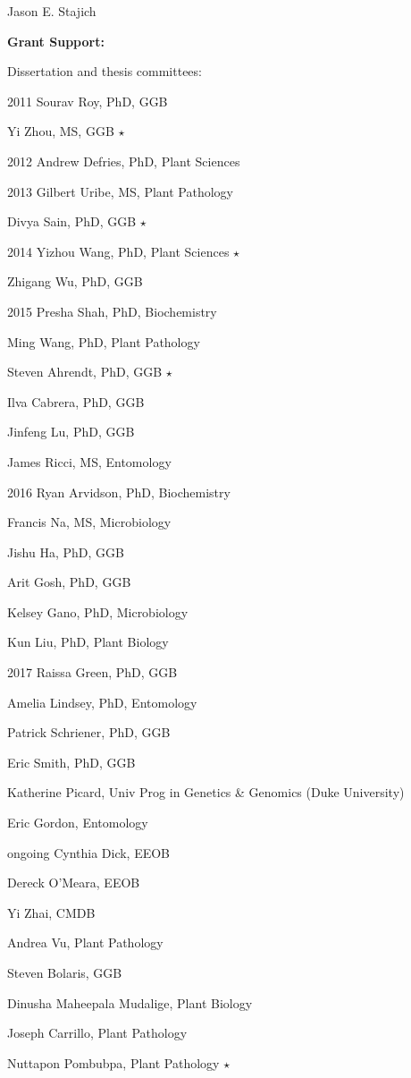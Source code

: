\documentclass[10pt]{article}
\begin{document}
\begin{cv}{\centerline{Jason E. Stajich}}
\begin{cvlistcompact}{\bf Grant Support:}
\begin{cvlistcompact}{Dissertation and thesis committees:}
\item [2011] Sourav Roy, PhD, GGB
\item Yi Zhou, MS, GGB $\star$
\item [2012] Andrew Defries, PhD, Plant Sciences
\item [2013] Gilbert Uribe, MS, Plant Pathology
\item Divya Sain, PhD, GGB $\star$
\item [2014] Yizhou Wang, PhD, Plant Sciences $\star$
\item Zhigang Wu, PhD, GGB
\item [2015] Presha Shah, PhD, Biochemistry
\item Ming Wang, PhD, Plant Pathology
\item Steven Ahrendt, PhD, GGB $\star$
\item Ilva Cabrera, PhD, GGB
\item Jinfeng Lu, PhD, GGB
\item James Ricci, MS, Entomology
\item [2016] Ryan Arvidson, PhD, Biochemistry
\item Francis Na, MS, Microbiology
\item Jishu Ha, PhD, GGB
\item Arit Gosh, PhD, GGB
\item Kelsey Gano, PhD, Microbiology
\item Kun Liu, PhD, Plant Biology
\item [2017] Raissa Green, PhD, GGB
\item Amelia Lindsey, PhD, Entomology
\item Patrick Schriener, PhD, GGB
\item Eric Smith, PhD, GGB
\item Katherine Picard, Univ Prog in Genetics \& Genomics (Duke University)
\item Eric Gordon, Entomology
\item [ongoing] Cynthia Dick, EEOB
\item Dereck O'Meara, EEOB
\item Yi Zhai, CMDB
\item Andrea Vu, Plant Pathology
\item Steven Bolaris, GGB
\item Dinusha Maheepala Mudalige, Plant Biology
\item Joseph Carrillo, Plant Pathology
\item Nuttapon Pombubpa, Plant Pathology $\star$

\end{cvlistcompact}
\end{cvlistcompact}
\end{cv}
\end{document}
